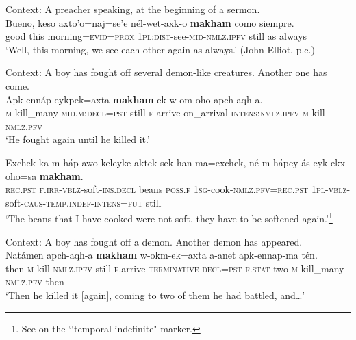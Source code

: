 \begin{exe}
	\ex\label{exAppendixEnxetSurIterative1}
	Context: A preacher speaking, at the beginning of a sermon.\\
	\gll
	Bueno, keso axto’o=naj=se’e nél-wet-axk-o \textbf{makham} como siempre.\\
	good this morning=\textsc{evid}=\textsc{prox} 1\textsc{pl}:\textsc{dist}-see-\textsc{mid}-\textsc{nmlz}.\textsc{ipfv} still as always\\
	\glt \lq Well, this morning, we see each other again as always.\rq{ }(John Elliot, p.c.)

	\ex\label{exAppendixEnxetSurIterative2}
	Context: A boy has fought off several demon-like creatures. Another one has come.\\
	\gll Apk-ennáp-eykpek=axta \textbf{makham} ek-w-om-oho apch-aqh-a.\\
	\textsc{m}-kill\_many-\textsc{mid}.\textsc{m}:\textsc{decl}=\textsc{pst} still \textsc{f}-arrive-on\_arrival-\textsc{intens}:\textsc{nmlz}.\textsc{ipfv} \textsc{m-}kill-\textsc{nmlz}.\textsc{pfv}\\
	\glt \lq He fought again until he killed it.' \parencite[758]{Elliot2021}

	\ex\label{exAppendixEnxetSurIterative3}
	\gll Exchek ka-m-háp-awo keleyke aktek sek-han-ma=exchek, né-m-hápey-ás-eyk-ekx-oho=sa \textbf{makham}.\\
	\textsc{rec}.\textsc{pst} \textsc{f}.\textsc{irr}-\textsc{vblz}-soft-\textsc{ins}.\textsc{decl} beans \textsc{poss}.\textsc{f} 1\textsc{sg}-cook-\textsc{nmlz}.\textsc{pfv}=\textsc{rec}.\textsc{pst} 1\textsc{pl}-\textsc{vblz}-soft-\textsc{caus}-\textsc{temp}.\textsc{indef}-\textsc{intens}=\textsc{fut} still\\
	\glt \lq The beans that I have cooked were not soft, they have to be softened again.'\footnote{See \textcite[169–175]{Elliot2021} on the \lq\lq temporal indefinite" marker.}  \parencite[447]{Elliot2021}
		
	\ex\label{exAppendixEnxetSurIterative4}
	Context: A boy has fought off a demon. Another demon has appeared.\\
	\gll Natámen apch-aqh-a \textbf{makham} w-okm-ek=axta a-anet apk-ennap-ma tén.\\
	then \textsc{m}-kill-\textsc{nmlz}.\textsc{ipfv} still \textsc{f}.arrive-\textsc{terminative}-\textsc{decl}=\textsc{pst} \textsc{f}.\textsc{stat}-two \textsc{m}-kill\_many-\textsc{nmlz}.\textsc{pfv} then\\
	\glt \lq Then he killed it [again], coming to two of them he had battled, and…' \parencite[757]{Elliot2021}


\end{exe}
